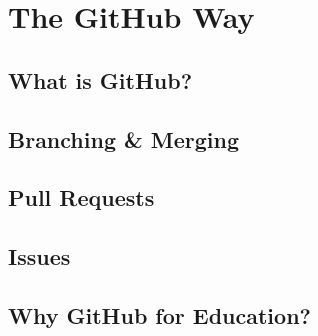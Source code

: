 \chapter{The GitHub Way}

\section{What is GitHub?}

\section{Branching \& Merging}

\section{Pull Requests}

\section{Issues}

\section{Why GitHub for Education?}

